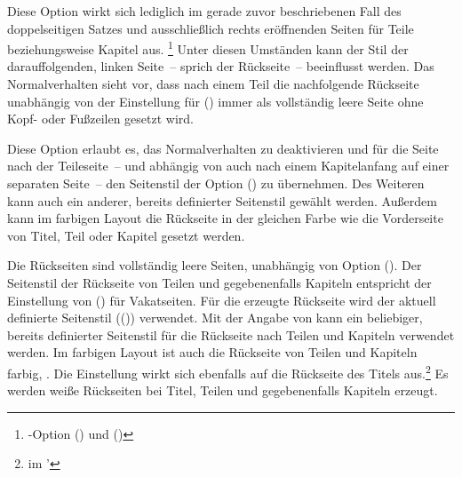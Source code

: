 \begin{DeclareEntity*}{}
\begin{DeclareEntity*}{}
\begin{DeclareEntity*}{}
\begin{Declaration}
Diese Option wirkt sich lediglich im gerade zuvor beschriebenen Fall des 
doppelseitigen Satzes und ausschließlich rechts eröffnenden Seiten für Teile 
beziehungsweise Kapitel aus.%
\footnote{%
  \KOMAScript-Option () und 
  ()%
}
Unter diesen Umständen kann der Stil der darauffolgenden, linken Seite~-- 
sprich der Rückseite~-- beeinflusst werden. Das Normalverhalten sieht vor, dass 
nach einem Teil die nachfolgende Rückseite unabhängig von der Einstellung für 
() immer als vollständig leere 
Seite ohne Kopf- oder Fußzeilen gesetzt wird.

Diese Option erlaubt es, das Normalverhalten zu deaktivieren und für die Seite 
nach der Teileseite~-- und abhängig von  auch nach einem 
Kapitelanfang auf einer separaten Seite~-- den Seitenstil der Option 
() zu übernehmen. Des Weiteren 
kann auch ein anderer, bereits definierter Seitenstil gewählt werden. Außerdem 
kann im farbigen Layout die Rückseite in der gleichen Farbe wie die Vorderseite 
von Titel, Teil oder Kapitel gesetzt werden. 
\notudscrartcl
\begin{DeclareValues}
  Die Rückseiten sind vollständig leere Seiten, unabhängig von Option
  ().
  Der Seitenstil der Rückseite von Teilen und gegebenenfalls Kapiteln entspricht
  der Einstellung von () für 
  Vakatseiten.
  Für die erzeugte Rückseite wird der aktuell definierte Seitenstil 
  (()) verwendet.
  Mit der Angabe von  
  kann ein beliebiger, bereits definierter Seitenstil für die Rückseite nach 
  Teilen und Kapiteln verwendet werden.
  Im farbigen Layout ist auch die Rückseite von Teilen und Kapiteln farbig,  
  . Die Einstellung wirkt sich ebenfalls auf die Rückseite 
  des Titels aus.\footnote{%
     im \scrguide'%
  }%
  Es werden weiße Rückseiten bei Titel, Teilen und gegebenenfalls Kapiteln 
  erzeugt.
\end{DeclareValues}
\end{Declaration}
%




\end{DeclareEntity*}
\end{DeclareEntity*}
\end{DeclareEntity*}
